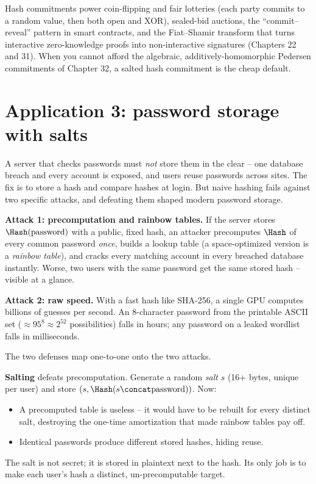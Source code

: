 \begin{applicationbox}
Hash commitments power coin-flipping and fair lotteries (each party commits to a random value, then both open and XOR), sealed-bid auctions, the ``commit--reveal'' pattern in smart contracts, and the Fiat--Shamir transform that turns interactive zero-knowledge proofs into non-interactive signatures (Chapters 22 and 31). When you cannot afford the algebraic, additively-homomorphic Pedersen commitments of Chapter 32, a salted hash commitment is the cheap default.
\end{applicationbox}

\section{Application 3: password storage with salts}
\label{ch14:passwords}

A server that checks passwords must \emph{not} store them in the clear -- one database breach and every account is exposed, and users reuse passwords across sites. The fix is to store a hash and compare hashes at login. But naive hashing fails against two specific attacks, and defeating them shaped modern password storage.

\begin{attackbox}
\textbf{Attack 1: precomputation and rainbow tables.} If the server stores $\Hash(\text{password})$ with a public, fixed hash, an attacker precomputes $\Hash$ of every common password \emph{once}, builds a lookup table (a space-optimized version is a \emph{rainbow table}), and cracks every matching account in every breached database instantly. Worse, two users with the same password get the same stored hash -- visible at a glance.

\textbf{Attack 2: raw speed.} With a fast hash like SHA-256, a single GPU computes billions of guesses per second. An 8-character password from the printable ASCII set ($\approx 95^{8} \approx 2^{52}$ possibilities) falls in hours; any password on a leaked wordlist falls in milliseconds.
\end{attackbox}

The two defenses map one-to-one onto the two attacks.

\textbf{Salting} defeats precomputation. Generate a random \emph{salt} $s$ (16+ bytes, unique per user) and store $(s, \Hash(s \concat \text{password}))$. Now:
\begin{itemize}
  \item A precomputed table is useless -- it would have to be rebuilt for every distinct salt, destroying the one-time amortization that made rainbow tables pay off.
  \item Identical passwords produce different stored hashes, hiding reuse.
\end{itemize}
The salt is not secret; it is stored in plaintext next to the hash. Its only job is to make each user's hash a distinct, un-precomputable target.

